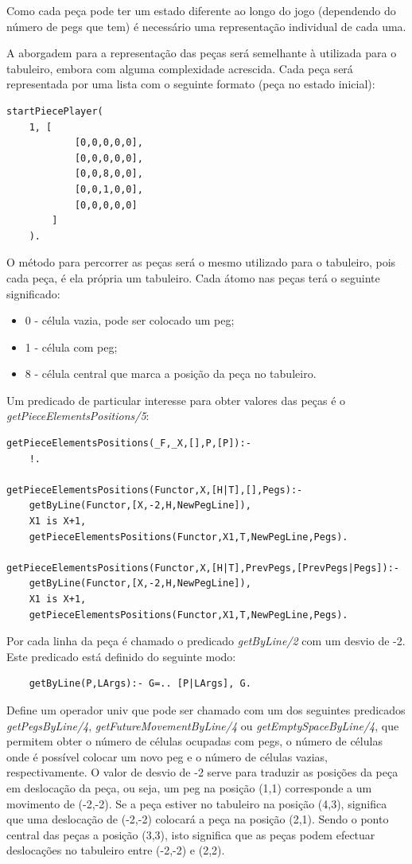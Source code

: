 \documentclass[paper=a4, fontsize=11pt]{scrartcl} %
\numberwithin{equation}{section} %
\numberwithin{figure}{section} %
\numberwithin{table}{section} %
\begin{document}
Como cada peça pode ter um estado diferente ao longo do jogo (dependendo do número de pegs que tem) é necessário uma representação individual de cada uma.

A aborgadem para a representação das peças será semelhante à utilizada para o tabuleiro, embora com alguma complexidade acrescida. Cada peça será representada por uma lista com o seguinte formato (peça no estado inicial):

\begin{lstlisting}
startPiecePlayer(
	1, [
			[0,0,0,0,0],
			[0,0,0,0,0],
			[0,0,8,0,0],
			[0,0,1,0,0],
			[0,0,0,0,0]
		]
	).
\end{lstlisting}

O método para percorrer as peças será o mesmo utilizado para o tabuleiro, pois cada peça, é ela própria um tabuleiro. Cada átomo nas peças terá o seguinte significado:

\begin{itemize}
	\item 0 -  célula vazia, pode ser colocado um peg;
	\item 1 - célula com peg;
	\item 8 - célula central que marca a posição da peça no tabuleiro.
\end{itemize}

Um predicado de particular interesse para obter valores das peças é o \textit{getPieceElementsPositions/5}:

\begin{lstlisting}
getPieceElementsPositions(_F,_X,[],P,[P]):-
	!.
	
getPieceElementsPositions(Functor,X,[H|T],[],Pegs):-
	getByLine(Functor,[X,-2,H,NewPegLine]),
	X1 is X+1,
	getPieceElementsPositions(Functor,X1,T,NewPegLine,Pegs).

getPieceElementsPositions(Functor,X,[H|T],PrevPegs,[PrevPegs|Pegs]):-
	getByLine(Functor,[X,-2,H,NewPegLine]),
	X1 is X+1,
	getPieceElementsPositions(Functor,X1,T,NewPegLine,Pegs).
\end{lstlisting}

Por cada linha da peça é chamado o predicado \textit{getByLine/2} com um desvio de -2. Este predicado está definido do seguinte modo:

\begin{lstlisting}
	getByLine(P,LArgs):- G=.. [P|LArgs], G.
\end{lstlisting}

Define um operador univ que pode ser chamado com um dos seguintes predicados \textit{getPegsByLine/4}, \textit{getFutureMovementByLine/4} ou \textit{getEmptySpaceByLine/4}, que permitem obter o número de células ocupadas com pegs, o número de células onde é possível colocar um novo peg e o número de células vazias, respectivamente. O valor de desvio de -2 serve para traduzir as posições da peça em deslocação da peça, ou seja, um peg na posição (1,1) corresponde a um movimento de (-2,-2). Se a peça estiver no tabuleiro na posição (4,3), significa que uma deslocação de (-2,-2) colocará a peça na posição (2,1). Sendo o ponto central das peças a posição (3,3), isto significa que as peças podem efectuar deslocações no tabuleiro entre (-2,-2) e (2,2).
\end{document}
